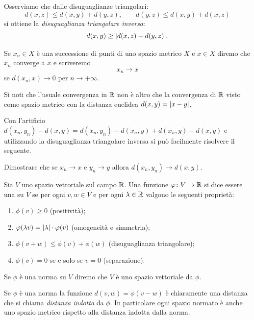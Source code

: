 Osserviamo che dalle disuguaglianze triangolari:
\[
  d(x,z) \le d(x,y) + d(y,z), \qquad
  d(y,z) \le d(x,y) + d(x,z)
\]
si ottiene la \emph{disuguaglianza triangolare inversa}:
\[
  d(x,y) \ge {\left|d(x,z) - d(y,z)\right|}.
\]

\begin{definition}[convergenza]
\mymark{*}
Se $x_n \in X$ è una successione di punti di uno spazio metrico $X$
e $x\in X$ diremo che $x_n$ converge a $x$ e scriveremo
\[
  x_n \to x
\]
se $d(x_n,x)\to 0$ per $n\to +\infty$.
\end{definition}

Si noti che l'usuale convergenza in $\mathbb R$ non è altro
che la convergenza di $\mathbb R$
visto come spazio metrico con la distanza euclidea $d(x,y) = {\left|x-y\right|}$.

Con l'artificio $d(x_n,y_n) - d(x,y) = d(x_n,y_n) - d(x_n,y) + d(x_n,y) - d(x,y)$
e utilizzando la disuguaglianza triangolare inversa si può
facilmente risolvere il seguente.

\begin{exercise}
Dimostrare che se $x_n\to x$ e $y_n\to y$
allora $d(x_n,y_n) \to d(x,y)$.
\end{exercise}

\begin{definition}
\mymark{*}
\label{def:norma}
Sia $V$ uno spazio vettoriale sul campo $\mathbb R$.
Una funzione $\varphi \colon V\to \mathbb R$ si
dice essere una  su $V$ se
per ogni $v,w\in V$ e per ogni $\lambda \in \mathbb R$
valgono le seguenti proprietà:
\begin{enumerate}
\item
  $\phi(v) \ge 0$ (positività);
\item
  $\varphi(\lambda v) = {\left|\lambda\right|} \cdot \varphi(v)$ (omogeneità e simmetria);
\item
  $\phi(v+w) \le \phi(v) + \phi(w)$
  (disuguaglianza triangolare);
\item
  $\phi(v)=0$ se e solo se $v=0$ (separazione).
\end{enumerate}

Se $\phi$ è una norma su $V$ diremo che
$V$
è uno spazio vettoriale  da $\phi$.

Se $\phi$ è una norma la funzione $d(v,w) = \phi(v-w)$
è chiaramente una distanza che si chiama
\emph{distanza indotta}
da $\phi$.
In particolare ogni spazio normato è anche uno spazio metrico rispetto alla
distanza indotta dalla norma.
\end{definition}

